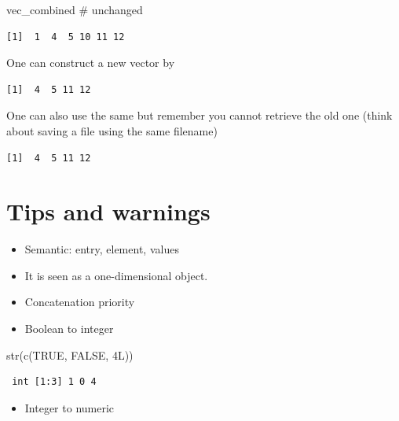 \documentclass[
  letterpaper,
  DIV=11,
  numbers=noendperiod]{scrreprt}
\newenvironment{Shaded}{\begin{snugshade}}{\end{snugshade}}
\newcommand{\CommentTok}[1]{\textcolor[rgb]{0.37,0.37,0.37}{#1}}
\newcommand{\ConstantTok}[1]{\textcolor[rgb]{0.56,0.35,0.01}{#1}}
\newcommand{\DecValTok}[1]{\textcolor[rgb]{0.68,0.00,0.00}{#1}}
\newcommand{\FunctionTok}[1]{\textcolor[rgb]{0.28,0.35,0.67}{#1}}
\newcommand{\NormalTok}[1]{\textcolor[rgb]{0.00,0.23,0.31}{#1}}
\providecommand{\tightlist}{%
  \setlength{\itemsep}{0pt}\setlength{\parskip}{0pt}}
\begin{document}
\begin{Shaded}
\begin{Highlighting}[]
\NormalTok{vec\_combined }\CommentTok{\# unchanged}
\end{Highlighting}
\end{Shaded}

\begin{verbatim}
[1]  1  4  5 10 11 12
\end{verbatim}

One can construct a new vector by

\begin{verbatim}
[1]  4  5 11 12
\end{verbatim}

One can also use the same but remember you cannot retrieve the old one
(think about saving a file using the same filename)

\begin{verbatim}
[1]  4  5 11 12
\end{verbatim}

\section*{Tips and warnings}\label{tips-and-warnings-27}


\begin{itemize}
\tightlist
\item
  Semantic: entry, element, values
\item
  It is seen as a one-dimensional object.
\item
  Concatenation priority
\item
  Boolean to integer
\end{itemize}

\begin{Shaded}
\begin{Highlighting}[]
\FunctionTok{str}\NormalTok{(}\FunctionTok{c}\NormalTok{(}\ConstantTok{TRUE}\NormalTok{, }\ConstantTok{FALSE}\NormalTok{, }\DecValTok{4}\NormalTok{L))}
\end{Highlighting}
\end{Shaded}

\begin{verbatim}
 int [1:3] 1 0 4
\end{verbatim}

\begin{itemize}
\tightlist
\item
  Integer to numeric
\end{itemize}
\end{document}
